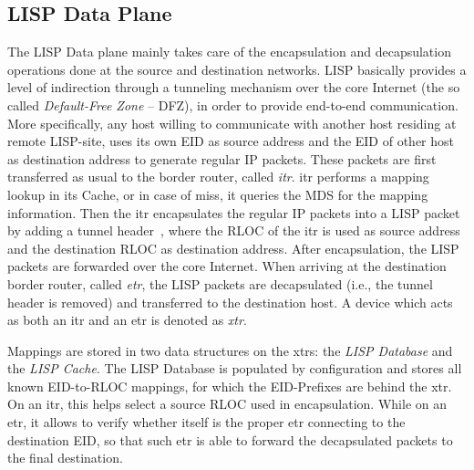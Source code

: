 \subsection{LISP Data Plane}
\label{sec:data_plane}
The LISP Data plane mainly takes care of the encapsulation and decapsulation operations done at the source and destination networks. LISP basically provides a level of indirection through a tunneling mechanism over the core Internet (the so called \emph{Default-Free Zone} -- DFZ), in order to provide end-to-end communication. More specifically, any host willing to communicate with another host residing at remote LISP-site, uses its own EID as source address and the EID of other host as destination address to generate regular IP packets. These packets are first transferred as usual to the border router, called \emph{\acrfull{itr}}. \acrshort{itr} performs a mapping lookup in its Cache, or in case of miss, it queries the MDS for the mapping information. Then the \acrshort{itr} encapsulates the regular IP packets into a LISP packet by adding a tunnel header~\cite{rfc6830}, where the RLOC of the \acrshort{itr} is used as source address and the destination RLOC as destination address. After encapsulation, the LISP packets are forwarded over the core Internet. When arriving at the destination border router, called \emph{\acrfull{etr}}, the LISP packets are decapsulated (i.e., the tunnel header is removed) and transferred to the destination host. A device which acts as both an \acrshort{itr} and an \acrshort{etr} is denoted as \emph{\acrshort{xtr}}.

Mappings are stored in two data structures on the \acrshort{xtr}s: the \emph{LISP Database} and the \emph{LISP Cache}. The LISP Database is populated by configuration and stores all known EID-to-RLOC mappings, for which the EID-Prefixes are behind the \acrshort{xtr}. On an \acrshort{itr}, this helps select a source RLOC used in encapsulation. While on an \acrshort{etr}, it allows to verify whether itself is the proper \acrshort{etr} connecting to the destination EID, so that such \acrshort{etr} is able to forward the decapsulated packets to the final destination. 

